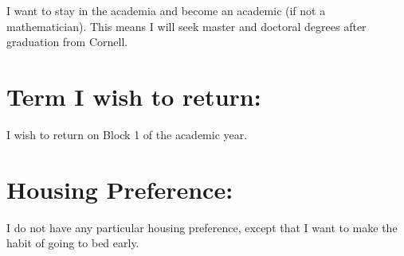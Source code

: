 	I want to stay in the academia and become an academic (if not a mathematician). This means I will seek master and doctoral degrees after graduation from Cornell.
	
	\section*{Term I wish to return:}
	I wish to return on Block 1 of the  academic year.
	
	\section*{Housing Preference:}
	I do not have any particular housing preference, except that I want to make the habit of going to bed early.
	
	\nocite{*}
	
	\printbibliography
